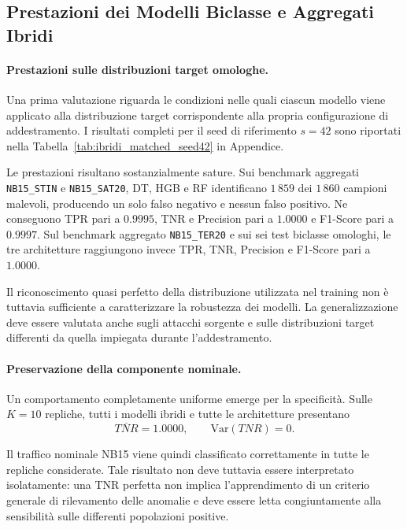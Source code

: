 
\subsection{Prestazioni dei Modelli Biclasse e Aggregati Ibridi}
\label{subsec:ibridi_prestazioni}

\paragraph{Prestazioni sulle distribuzioni target omologhe.}
Una prima valutazione riguarda le condizioni nelle quali ciascun modello viene applicato alla distribuzione target corrispondente alla propria configurazione di addestramento. 
I risultati completi per il seed di riferimento $s=42$ sono riportati nella Tabella~\ref{tab:ibridi_matched_seed42} in Appendice.

Le prestazioni risultano sostanzialmente sature. 
Sui benchmark aggregati \texttt{NB15\_STIN} e \newline \texttt{NB15\_SAT20}, DT, HGB e RF identificano $1\,859$ dei $1\,860$ campioni malevoli, producendo un solo falso negativo e nessun falso positivo. 
Ne conseguono TPR pari a $0.9995$, TNR e Precision pari a $1.0000$ e F1-Score pari a $0.9997$. 
Sul benchmark aggregato \texttt{NB15\_TER20} e sui sei test biclasse omologhi, le tre architetture raggiungono invece TPR, TNR, Precision e F1-Score pari a $1.0000$.

Il riconoscimento quasi perfetto della distribuzione utilizzata nel training non è tuttavia sufficiente a caratterizzare la robustezza dei modelli. 
La generalizzazione deve essere valutata anche sugli attacchi sorgente e sulle distribuzioni target differenti da quella impiegata durante l'addestramento.

\paragraph{Preservazione della componente nominale.}
Un comportamento completamente uniforme emerge per la specificità. 
Sulle $K=10$ repliche, tutti i modelli ibridi e tutte le architetture presentano
\[
    \overline{TNR}=1.0000,
    \qquad
    \mathrm{Var}(TNR)=0.
\]

Il traffico nominale NB15 viene quindi classificato correttamente in tutte le repliche considerate. 
Tale risultato non deve tuttavia essere interpretato isolatamente: una TNR perfetta non implica l'apprendimento di un criterio generale di rilevamento delle anomalie e deve essere letta congiuntamente alla sensibilità sulle differenti popolazioni positive.

